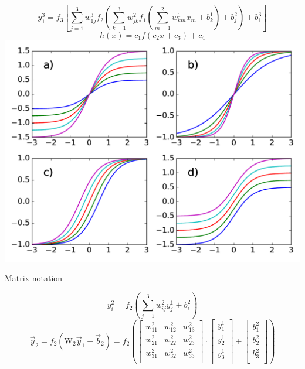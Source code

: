 \documentclass{beamer}
\begin{document}
\begin{frame}

\begin{equation*}
  y_1^3 = f_3\left[\sum_{j=1}^3 w_{1j}^3 f_2\left(\sum_{k=1}^3 w_{jk}^2 f_1\left(\sum_{m=1}^2 w_{km}^1 x_m + b_k^1\right) + b_j^2\right)
  + b_1^3\right]
\end{equation*}
\begin{equation*}
 h(x) = c_1 f(c_2 x + c_3) + c_4
\end{equation*}
\centering
\includegraphics[width = 0.7\linewidth]{../Figures/Theory/activationFlex.pdf}

\end{frame}
 
 
\begin{frame}{Matrix notation}

\begin{equation*}
  y_i^2 = f_2\left(\sum_{j=1}^3 w_{ij}^2 y_j^1 + b_i^2\right)
\end{equation*}
\begin{equation*}
 \vec{y}_2 = f_2(\mathrm{W}_2 \vec{y}_{1} + \vec{b}_{2}) = 
 f_2\left(\left[\begin{array}{ccc}
    w^2_{11} &w^2_{12} &w^2_{13} \\
    w^2_{21} &w^2_{22} &w^2_{23} \\
    w^2_{31} &w^2_{32} &w^2_{33} \\
    \end{array} \right] \cdot
    \left[\begin{array}{c}
           y^1_1 \\
           y^1_2 \\
           y^1_3 \\
          \end{array}\right] + 
    \left[\begin{array}{c}
           b^2_1 \\
           b^2_2 \\
           b^2_3 \\
          \end{array}\right]\right)
\end{equation*}

\end{frame}
\end{document}
